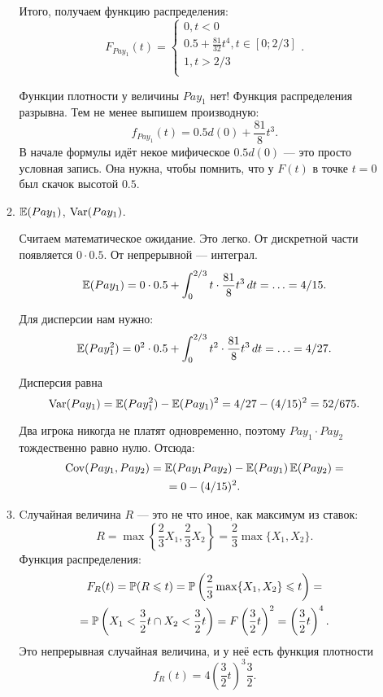 \begin{enumerate}
\begin{enumerate}
Итого, получаем функцию распределения:
\begin{equation}
F_{Pay_{1}}(t)=
\begin{cases}
0, t<0 \\
0.5+\frac{81}{32}t^{4}, t\in [0;2/3] \\
1, t>2/3 \\
\end{cases}.
\end{equation}

Функции плотности у величины $ Pay_{1} $ нет! Функция распределения разрывна. Тем не менее выпишем производную:
\begin{equation}
f_{Pay_{1}}(t)=0.5d(0)+\frac{81}{8}t^{3}.
\end{equation}
В начале формулы идёт некое мифическое $ 0.5d(0) $ — это просто условная запись. Она нужна, чтобы помнить, что у  $ F(t) $ в точке $ t=0 $ был скачок высотой $ 0.5 $.


\item $ \E(Pay_{1}) $, $\Var(Pay_{1}) $.

Считаем математическое ожидание. Это легко. От дискретной части появляется $ 0\cdot 0.5 $. От непрерывной — интеграл.
\begin{equation}
\E(Pay_{1})=0\cdot 0.5+\int_{0}^{2/3}t\cdot \frac{81}{8}t^{3} \, dt=\ldots=4/15.
\end{equation}

Для дисперсии нам нужно:
\begin{equation}
\E(Pay_{1}^{2})=0^{2}\cdot 0.5+\int_{0}^{2/3}t^{2}\cdot \frac{81}{8}t^{3} \, dt=\ldots=4/27.
\end{equation}

Дисперсия равна
\begin{equation}
\Var(Pay_{1})=\E(Pay_{1}^{2})-\E(Pay_{1})^{2}=4/27-(4/15)^{2}=52/675.
\end{equation}


Два игрока никогда не платят одновременно, поэтому $ Pay_{1}\cdot Pay_{2} $ тождественно равно нулю. Отсюда:
\begin{multline}
\Cov(Pay_{1},Pay_{2})=\E(Pay_{1}Pay_{2})-\E(Pay_{1})\E(Pay_{2})=\\
=0-(4/15)^{2}.
\end{multline}
\item Cлучайная величина $R$ — это не что иное, как максимум из ставок:
\begin{equation}
R=\max\left\{ \frac{2}{3}X_{1},\frac{2}{3}X_{2} \right\}=\frac{2}{3}\max\{X_{1},X_{2}\}.
\end{equation}
Функция распределения:
\begin{multline}
F_{R}(t)=\P(R\leq t)=\P\left(\frac{2}{3}\max\{X_{1},X_{2}\}\leq t\right)=\\
=\P\left(X_{1}<\frac{3}{2}t \cap X_{2}<\frac{3}{2}t\right)=F\left(\frac{3}{2}t\right)^{2}=\left(\frac{3}{2}t\right)^{4}.
\end{multline}
Это непрерывная случайная величина, и у неё есть функция плотности
\begin{equation}
f_{R}(t)=4\left(\frac{3}{2}t\right)^{3}\frac{3}{2}.
\end{equation}


\end{enumerate}
\end{enumerate}
